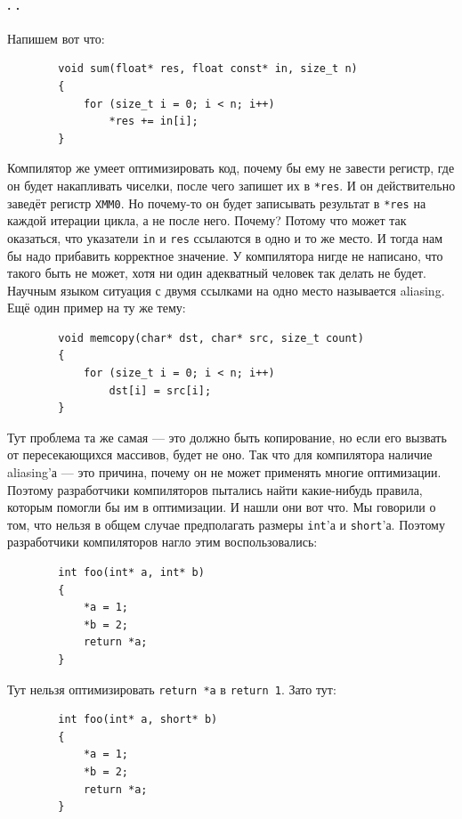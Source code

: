 \documentclass{article}
\newcommand{\asm}[1]{\texttt{#1}}
\begin{document}
    \paragraph{. .}
    Напишем вот что:
    \begin{verbatim}
        void sum(float* res, float const* in, size_t n)
        {
            for (size_t i = 0; i < n; i++)
                *res += in[i];
        }
    \end{verbatim}
    Компилятор же умеет оптимизировать код, почему бы ему не завести регистр, где он будет накапливать чиселки, после чего запишет их в \texttt{*res}. И он действительно заведёт регистр \asm{XMM0}. Но почему-то он будет записывать результат в \texttt{*res} на каждой итерации цикла, а не после него. Почему? Потому что может так оказаться, что указатели \texttt{in} и \texttt{res} ссылаются в одно и то же место. И тогда нам бы надо прибавить корректное значение. У компилятора нигде не написано, что такого быть не может, хотя ни один адекватный человек так делать не будет. Научным языком ситуация с двумя ссылками на одно место называется aliasing.\\
    Ещё один пример на ту же тему:
    \begin{verbatim}
        void memcopy(char* dst, char* src, size_t count)
        {
            for (size_t i = 0; i < n; i++)
                dst[i] = src[i];
        }
    \end{verbatim}
    Тут проблема та же самая --- это должно быть копирование, но если его вызвать от пересекающихся массивов, будет не оно. Так что для компилятора наличие aliasing'а --- это причина, почему он не может применять многие оптимизации. Поэтому разработчики компиляторов пытались найти какие-нибудь правила, которым помогли бы им в оптимизации. И нашли они вот что. Мы говорили о том, что нельзя в общем случае предполагать размеры \texttt{int}'а и \texttt{short}'а. Поэтому разработчики компиляторов нагло этим воспользовались:
    \begin{verbatim}
        int foo(int* a, int* b)
        {
            *a = 1;
            *b = 2;
            return *a;
        }
    \end{verbatim}
    Тут нельзя оптимизировать \texttt{return *a} в \texttt{return 1}. Зато тут:
    \begin{verbatim}
        int foo(int* a, short* b)
        {
            *a = 1;
            *b = 2;
            return *a;
        }
    \end{verbatim}
\end{document}
